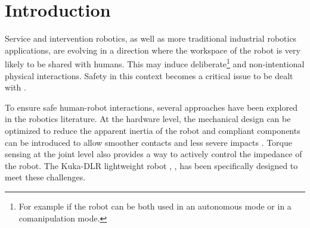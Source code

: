 \documentclass[a4paper, 10pt, conference]{ieeeconf}      %
\begin{document}




%
\IEEEpeerreviewmaketitle



\section{Introduction}
Service and intervention robotics, as well as more traditional industrial robotics applications, are evolving in a direction where the workspace of the robot is very likely to be shared with humans. This may induce deliberate\footnote{For example if the robot can be both used in an autonomous mode or in a comanipulation mode.} and non-intentional physical interactions. Safety in this context becomes a critical issue to be dealt with \cite{alami2006safe}.

To ensure safe human-robot interactions, several approaches have been explored in the robotics literature. At the hardware level, the mechanical design can be optimized to reduce the apparent inertia of the robot \cite{zinn2004} and compliant components can be introduced to allow smoother contacts and less severe impacts \cite{haddadin2012}. Torque sensing at the joint level also provides a way to actively control the impedance of the robot. The Kuka-DLR lightweight robot \cite{bischoff2010kuka}, \cite{loughlin2007dlr}, \cite{hirzinger2001} has been specifically designed to meet these challenges.
\end{document}
